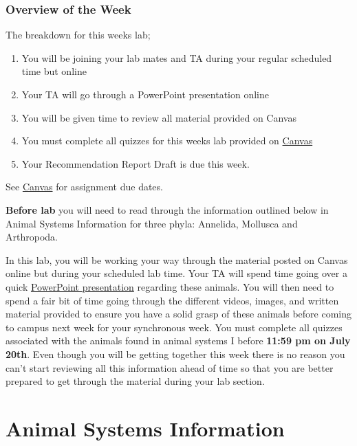 \documentclass[
]{book}
\providecommand{\tightlist}{%
  \setlength{\itemsep}{0pt}\setlength{\parskip}{0pt}}
\begin{document}
\hypertarget{overview-of-the-week}{%
\subsection*{Overview of the Week}\label{overview-of-the-week}}

The breakdown for this week\textquotesingle s lab;

\begin{enumerate}
\def\labelenumi{\arabic{enumi}.}
\tightlist
\item
  You will be joining your lab mates and TA during your regular scheduled time but online
\item
  Your TA will go through a PowerPoint presentation online
\item
  You will be given time to review all material provided on Canvas
\item
  You must complete all quizzes for this week\textquotesingle s lab provided on \href{https://canvas.ubc.ca/}{Canvas}
\item
  Your Recommendation Report Draft is due this week.
\end{enumerate}

See \href{https://canvas.ubc.ca}{Canvas} for assignment due dates.

\textbf{Before lab} you will need to read through the information outlined below in Animal Systems Information for three phyla: Annelida, Mollusca and Arthropoda.

In this lab, you will be working your way through the material posted on Canvas online but during your scheduled lab time. Your TA will spend time going over a quick \href{https://osf.io/download/sbqe7}{PowerPoint presentation} regarding these animals. You will then need to spend a fair bit of time going through the different videos, images, and written material provided to ensure you have a solid grasp of these animals before coming to campus next week for your synchronous week. You must complete all quizzes associated with the animals found in animal systems I before \textbf{11:59 pm on July 20th}. Even though you will be getting together this week there is no reason you can't start reviewing all this information ahead of time so that you are better prepared to get through the material during your lab section.

\hypertarget{animal-systems-information}{%
\chapter*{Animal Systems Information}\label{animal-systems-information}}
\end{document}
